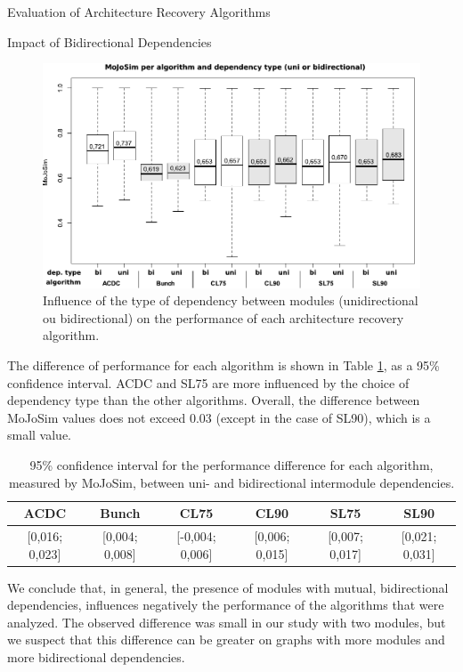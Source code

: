 \documentclass[11pt,twocolumn,a4paper,english]{article}
\begin{document}
\begin{section}{Evaluation of Architecture Recovery Algorithms}
\begin{subsection}{Impact of Bidirectional Dependencies}
	\begin{figure}[htbp]
		\centering
			\includegraphics[scale=1]{figures/exp-dependencies}
		\caption{Influence of the type of dependency between modules (unidirectional ou bidirectional) on the performance of each architecture recovery algorithm.}
		\label{fig:exp-dependencies}
	\end{figure}
	
	The difference of performance for each algorithm is shown in Table \ref{tab:exp-dependencies}, as a 95\% confidence interval. ACDC and SL75 are more influenced by the choice of dependency type than the other algorithms. Overall, the difference between MoJoSim values does not exceed 0.03 (except in the case of SL90), which is a small value.
	
	\begin{table}[width=\textwidth]
	  \begin{center}
	  \begin{tabular}{cccccc}
	    \hline
	    \textbf{ACDC} & \textbf{Bunch} & \textbf{CL75} & \textbf{CL90} & \textbf{SL75} & \textbf{SL90} \\
	    \hline
	    \hline
	    \footnotesize{[0,016; 0,023]} & \footnotesize{[0,004; 0,008]} & \footnotesize{[-0,004; 0,006]} & \footnotesize{[0,006; 0,015]} & \footnotesize{[0,007; 0,017]} & \footnotesize{[0,021; 0,031]} \\
	    \hline
	  \end{tabular}
	  \end{center}
	  \caption{95\% confidence interval for the performance difference for each algorithm, measured by MoJoSim, between uni- and bidirectional intermodule dependencies.}
	  \label{tab:exp-dependencies}
	\end{table}
	
	We conclude that, in general, the presence of modules with mutual, bidirectional dependencies, influences negatively the performance of the algorithms that were analyzed. The observed difference was small in our study with two modules, but we suspect that this difference can be greater on graphs with more modules and more bidirectional dependencies.


\end{subsection}
\end{section}
\end{document}
